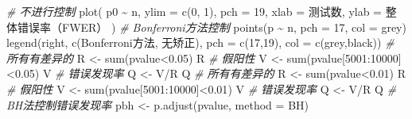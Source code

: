\documentclass[]{tufte-book}
\newenvironment{Shaded}{}{}
\newcommand{\AttributeTok}[1]{\textcolor[rgb]{0.49,0.56,0.16}{#1}}
\newcommand{\CommentTok}[1]{\textcolor[rgb]{0.38,0.63,0.69}{\textit{#1}}}
\newcommand{\DecValTok}[1]{\textcolor[rgb]{0.25,0.63,0.44}{#1}}
\newcommand{\FloatTok}[1]{\textcolor[rgb]{0.25,0.63,0.44}{#1}}
\newcommand{\FunctionTok}[1]{\textcolor[rgb]{0.02,0.16,0.49}{#1}}
\newcommand{\NormalTok}[1]{#1}
\newcommand{\OtherTok}[1]{\textcolor[rgb]{0.00,0.44,0.13}{#1}}
\newcommand{\SpecialCharTok}[1]{\textcolor[rgb]{0.25,0.44,0.63}{#1}}
\newcommand{\StringTok}[1]{\textcolor[rgb]{0.25,0.44,0.63}{#1}}
\begin{document}
\begin{Shaded}
\begin{Highlighting}[]
\CommentTok{\# 不进行控制}
\FunctionTok{plot}\NormalTok{(}
\NormalTok{  p0 }\SpecialCharTok{\textasciitilde{}}\NormalTok{ n,}
  \AttributeTok{ylim =} \FunctionTok{c}\NormalTok{(}\DecValTok{0}\NormalTok{, }\DecValTok{1}\NormalTok{),}
  \AttributeTok{pch =} \DecValTok{19}\NormalTok{,}
  \AttributeTok{xlab =} \StringTok{\textquotesingle{}测试数\textquotesingle{}}\NormalTok{,}
  \AttributeTok{ylab =} \StringTok{\textquotesingle{}整体错误率（FWER）\textquotesingle{}}
\NormalTok{)}
\CommentTok{\# Bonferroni方法控制}
\FunctionTok{points}\NormalTok{(p }\SpecialCharTok{\textasciitilde{}}\NormalTok{ n, }\AttributeTok{pch =} \DecValTok{17}\NormalTok{, }\AttributeTok{col =} \StringTok{\textquotesingle{}grey\textquotesingle{}}\NormalTok{)}
\FunctionTok{legend}\NormalTok{(}\StringTok{\textquotesingle{}right\textquotesingle{}}\NormalTok{,}
       \FunctionTok{c}\NormalTok{(}\StringTok{\textquotesingle{}Bonferroni方法\textquotesingle{}}\NormalTok{, }\StringTok{\textquotesingle{}无矫正\textquotesingle{}}\NormalTok{),}
       \AttributeTok{pch =} \FunctionTok{c}\NormalTok{(}\DecValTok{17}\NormalTok{,}\DecValTok{19}\NormalTok{),}
       \AttributeTok{col =} \FunctionTok{c}\NormalTok{(}\StringTok{\textquotesingle{}grey\textquotesingle{}}\NormalTok{,}\StringTok{\textquotesingle{}black\textquotesingle{}}\NormalTok{))}
\CommentTok{\# 所有有差异的}
\NormalTok{R }\OtherTok{\textless{}{-}} \FunctionTok{sum}\NormalTok{(pvalue}\SpecialCharTok{\textless{}}\FloatTok{0.05}\NormalTok{)}
\NormalTok{R}
\CommentTok{\# 假阳性}
\NormalTok{V }\OtherTok{\textless{}{-}} \FunctionTok{sum}\NormalTok{(pvalue[}\DecValTok{5001}\SpecialCharTok{:}\DecValTok{10000}\NormalTok{]}\SpecialCharTok{\textless{}}\FloatTok{0.05}\NormalTok{)}
\NormalTok{V}
\CommentTok{\# 错误发现率}
\NormalTok{Q }\OtherTok{\textless{}{-}}\NormalTok{ V}\SpecialCharTok{/}\NormalTok{R}
\NormalTok{Q}
\CommentTok{\# 所有有差异的}
\NormalTok{R }\OtherTok{\textless{}{-}} \FunctionTok{sum}\NormalTok{(pvalue}\SpecialCharTok{\textless{}}\FloatTok{0.01}\NormalTok{)}
\NormalTok{R}
\CommentTok{\# 假阳性}
\NormalTok{V }\OtherTok{\textless{}{-}} \FunctionTok{sum}\NormalTok{(pvalue[}\DecValTok{5001}\SpecialCharTok{:}\DecValTok{10000}\NormalTok{]}\SpecialCharTok{\textless{}}\FloatTok{0.01}\NormalTok{)}
\NormalTok{V}
\CommentTok{\# 错误发现率}
\NormalTok{Q }\OtherTok{\textless{}{-}}\NormalTok{ V}\SpecialCharTok{/}\NormalTok{R}
\NormalTok{Q}
\CommentTok{\# BH法控制错误发现率}
\NormalTok{pbh }\OtherTok{\textless{}{-}} \FunctionTok{p.adjust}\NormalTok{(pvalue, }\AttributeTok{method =} \StringTok{\textquotesingle{}BH\textquotesingle{}}\NormalTok{)}

\end{Highlighting}
\end{Shaded}
\end{document}
